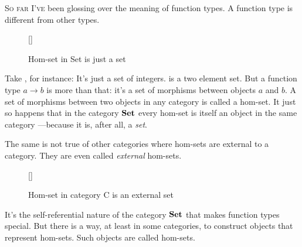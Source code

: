 \lettrine[lhang=0.17]{S}{o far I've} been glossing over the meaning of function types. A function
type is different from other types.

\begin{figure}
\raisebox{0pt}[\dimexpr{}\baselineskip\relax]{
}%
\caption{Hom-set in Set is just a set}
\end{figure}

Take , for instance: It's just a set of integers.
 is a two element set. But a function type
$a\to b$ is more than that: it's a set of morphisms
between objects $a$ and $b$. A set of morphisms between
two objects in any category is called a hom-set. It just so happens that
in the category $\mathbf{Set}$ every hom-set is itself an object in the
same category ---because it is, after all, a \emph{set}.

The same is not true of other categories where hom-sets are external to
a category. They are even called \emph{external} hom-sets.

\pagebreak
\begin{figure}
\raisebox{0pt}[\dimexpr\height]{
}%
\caption{Hom-set in category C is an external set}
\end{figure}

\noindent
It's the self-referential nature of the category $\mathbf{Set}$ that makes
function types special. But there is a way, at least in some categories,
to construct objects that represent hom-sets. Such objects are called
 hom-sets.

